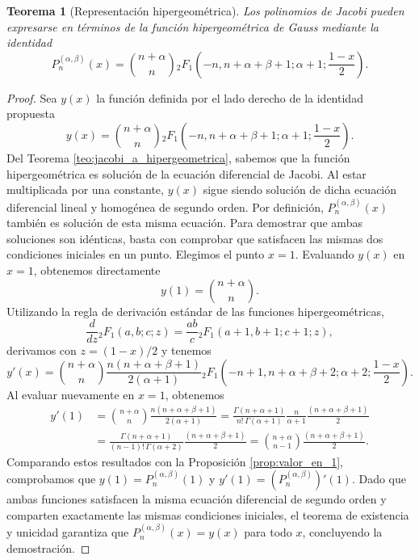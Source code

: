 \documentclass[12pt,a4paper]{book}
\newtheorem{theorem}{Teorema}
\begin{document}
\begin{theorem}[Representación hipergeométrica]
\label{teo:representacion_hipergeometrica}
Los polinomios de Jacobi pueden expresarse en términos de la función hipergeométrica de Gauss mediante la identidad
\[
    P_n^{(\alpha, \beta)}(x) = \binom{n+\alpha}{n} {}_{2}F_{1}\left(-n, n+\alpha+\beta+1; \alpha+1; \frac{1-x}{2}\right).
\]
\end{theorem}

\begin{proof}
Sea $y(x)$ la función definida por el lado derecho de la identidad propuesta
\[
y(x) = \binom{n+\alpha}{n} {}_{2}F_{1}\left(-n, n+\alpha+\beta+1; \alpha+1; \frac{1-x}{2}\right).
\]
Del Teorema \ref{teo:jacobi_a_hipergeometrica}, sabemos que la función hipergeométrica es solución de la ecuación diferencial de Jacobi. Al estar multiplicada por una constante, $y(x)$ sigue siendo solución de dicha ecuación diferencial lineal y homogénea de segundo orden. Por definición, $P_n^{(\alpha, \beta)}(x)$ también es solución de esta misma ecuación.
Para demostrar que ambas soluciones son idénticas, basta con comprobar que satisfacen las mismas dos condiciones iniciales en un punto. Elegimos el punto $x=1$.
Evaluando $y(x)$ en $x=1$,  obtenemos directamente
\[
y(1) = \binom{n+\alpha}{n}.
\]
Utilizando la regla de derivación estándar de las funciones hipergeométricas, 
\[
\frac{d}{dz}{}_{2}F_{1}(a,b;c;z) = \frac{ab}{c}{}_{2}F_{1}(a+1,b+1;c+1;z),
\]
derivamos con $z = (1-x)/2$ y tenemos
\begin{equation*}
    y'(x) = \binom{n+\alpha}{n} \frac{n(n+\alpha+\beta+1)}{2(\alpha+1)}  {}_{2}F_{1}\left(-n+1, n+\alpha+\beta+2; \alpha+2; \frac{1-x}{2}\right).
\end{equation*}
Al evaluar nuevamente en $x=1$, obtenemos
\begin{align*}
    y'(1) &= \binom{n+\alpha}{n} \frac{n(n+\alpha+\beta+1)}{2(\alpha+1)} = \frac{\Gamma(n+\alpha+1)}{n! \, \Gamma(\alpha+1)} \frac{n}{\alpha+1}\frac{(n+\alpha+\beta+1)}{2}\\ 
    &= \frac{\Gamma(n+\alpha+1)}{(n-1)! \, \Gamma(\alpha+2)} \frac{(n+\alpha+\beta+1)}{2} = \binom{n+\alpha}{n-1}\frac{(n+\alpha+\beta+1)}{2}.
\end{align*}
Comparando estos resultados con la Proposición \ref{prop:valor_en_1}, comprobamos que $y(1) = P_n^{(\alpha, \beta)}(1)$ y $y'(1) = (P_n^{(\alpha, \beta)})'(1)$. Dado que ambas funciones satisfacen la misma ecuación diferencial de segundo orden y comparten exactamente las mismas condiciones iniciales, el teorema de existencia y unicidad garantiza que $P_n^{(\alpha, \beta)}(x) = y(x)$ para todo $x$, concluyendo la demostración.
\end{proof}
\end{document}
